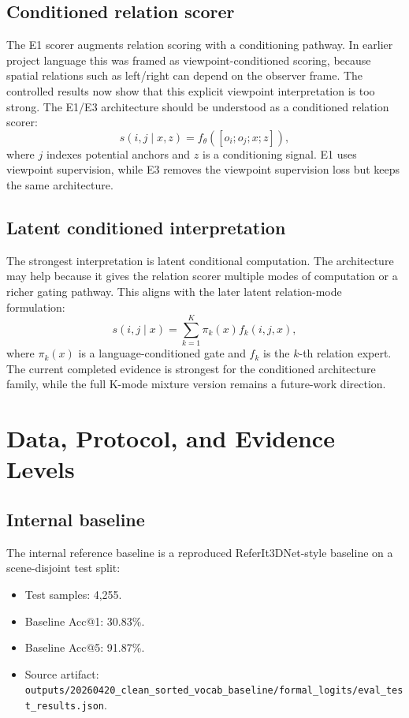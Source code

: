 \documentclass[11pt]{article}
\makeatletter
\newcommand{\acc}{Acc@1}
\newcommand{\acctopfive}{Acc@5}
\makeatother
\begin{document}
\subsection{Conditioned relation scorer}

The E1 scorer augments relation scoring with a conditioning pathway. In earlier project language this was framed as viewpoint-conditioned scoring, because spatial relations such as left/right can depend on the observer frame. The controlled results now show that this explicit viewpoint interpretation is too strong. The E1/E3 architecture should be understood as a conditioned relation scorer:
\begin{equation}
  s(i,j \mid x,z) = f_{\theta}([o_i; o_j; x; z]),
\end{equation}
where $j$ indexes potential anchors and $z$ is a conditioning signal. E1 uses viewpoint supervision, while E3 removes the viewpoint supervision loss but keeps the same architecture.

\subsection{Latent conditioned interpretation}

The strongest interpretation is latent conditional computation. The architecture may help because it gives the relation scorer multiple modes of computation or a richer gating pathway. This aligns with the later latent relation-mode formulation:
\begin{equation}
  s(i,j \mid x) = \sum_{k=1}^{K} \pi_k(x) f_k(i,j,x),
\end{equation}
where $\pi_k(x)$ is a language-conditioned gate and $f_k$ is the $k$-th relation expert. The current completed evidence is strongest for the conditioned architecture family, while the full K-mode mixture version remains a future-work direction.

\section{Data, Protocol, and Evidence Levels}

\subsection{Internal baseline}

The internal reference baseline is a reproduced ReferIt3DNet-style baseline on a scene-disjoint test split:
\begin{itemize}
  \item Test samples: 4,255.
  \item Baseline \acc{}: 30.83\%.
  \item Baseline \acctopfive{}: 91.87\%.
  \item Source artifact: \texttt{outputs/20260420\_clean\_sorted\_vocab\_baseline/formal\_logits/eval\_test\_results.json}.
\end{itemize}
\end{document}

